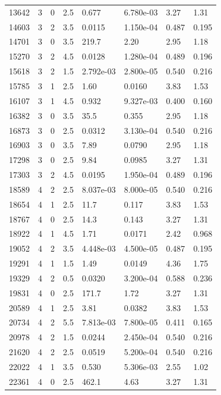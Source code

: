 \documentclass[preview]{standalone}
\begin{document}
{{{\begin{tabular}{L{1.2cm}C{1.2cm} C{0.3cm}C{0.5cm} C{1.4cm}C{1.4cm} C{1.4cm}C{1.4cm}}
  13642  &     3  & 0     & 2.5 &  0.677  & 6.780e-03  & 3.27 &  1.31   \\ 
  14603  &     3  & 2     & 3.5 &  0.0115  & 1.150e-04  & 0.487 &  0.195   \\ 
  14701  &     3  & 0     & 3.5 &  219.7  & 2.20  & 2.95 &  1.18   \\ 
  15270  &     3  & 2     & 4.5 &  0.0128  & 1.280e-04  & 0.489 &  0.196   \\ 
  15618  &     3  & 2     & 1.5 &  2.792e-03  & 2.800e-05  & 0.540 &  0.216   \\ 
  15785  &     3  & 1     & 2.5 &  1.60  & 0.0160  & 3.83 &  1.53   \\ 
  16107  &     3  & 1     & 4.5 &  0.932  & 9.327e-03  & 0.400 &  0.160   \\ 
  16382  &     3  & 0     & 3.5 &  35.5  & 0.355  & 2.95 &  1.18   \\ 
  16873  &     3  & 0     & 2.5 &  0.0312  & 3.130e-04  & 0.540 &  0.216   \\ 
  16903  &     3  & 0     & 3.5 &  7.89  & 0.0790  & 2.95 &  1.18   \\ 
  17298  &     3  & 0     & 2.5 &  9.84  & 0.0985  & 3.27 &  1.31   \\ 
  17303  &     3  & 2     & 4.5 &  0.0195  & 1.950e-04  & 0.489 &  0.196   \\ 
  18589  &     4  & 2     & 2.5 &  8.037e-03  & 8.000e-05  & 0.540 &  0.216   \\ 
  18654  &     4  & 1     & 2.5 &  11.7  & 0.117  & 3.83 &  1.53   \\ 
  18767  &     4  & 0     & 2.5 &  14.3  & 0.143  & 3.27 &  1.31   \\ 
  18922  &     4  & 1     & 4.5 &  1.71  & 0.0171  & 2.42 &  0.968   \\ 
  19052  &     4  & 2     & 3.5 &  4.448e-03  & 4.500e-05  & 0.487 &  0.195   \\ 
  19291  &     4  & 1     & 1.5 &  1.49  & 0.0149  & 4.36 &  1.75   \\ 
  19329  &     4  & 2     & 0.5 &  0.0320  & 3.200e-04  & 0.588 &  0.236   \\ 
  19831  &     4  & 0     & 2.5 &  171.7  & 1.72  & 3.27 &  1.31   \\ 
  20589  &     4  & 1     & 2.5 &  3.81  & 0.0382  & 3.83 &  1.53   \\ 
  20734  &     4  & 2     & 5.5 &  7.813e-03  & 7.800e-05  & 0.411 &  0.165   \\ 
  20978  &     4  & 2     & 1.5 &  0.0244  & 2.450e-04  & 0.540 &  0.216   \\ 
  21620  &     4  & 2     & 2.5 &  0.0519  & 5.200e-04  & 0.540 &  0.216   \\ 
  22022  &     4  & 1     & 3.5 &  0.530  & 5.306e-03  & 2.55 &  1.02   \\ 
  22361  &     4  & 0     & 2.5 &  462.1  & 4.63  & 3.27 &  1.31   \\ 
\hline 
\end{tabular} 

}}}
\end{document}
